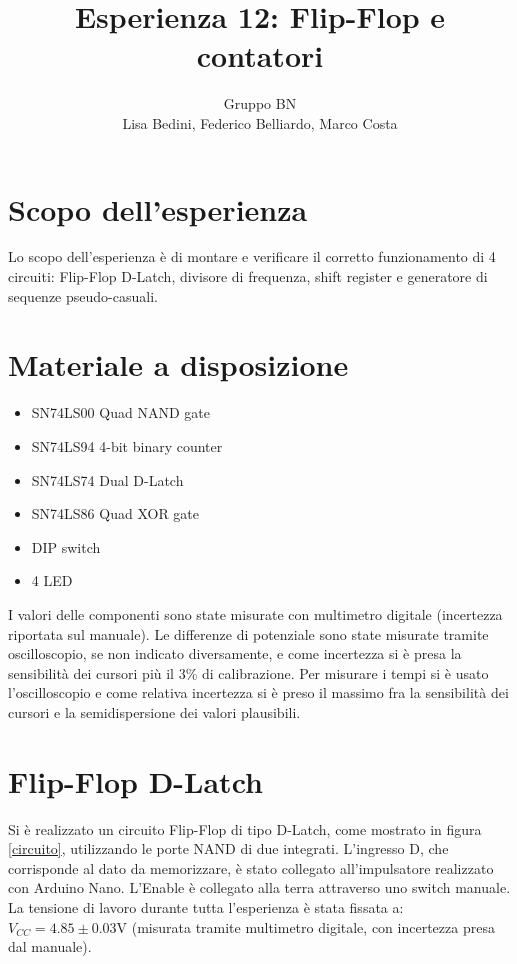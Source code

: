 \documentclass[10pt,a4paper]{article}
\author{Gruppo BN \\Lisa Bedini,  Federico Belliardo, Marco Costa}
\title{Esperienza 12: Flip-Flop e contatori}
\begin{document}
\maketitle


\section{Scopo dell'esperienza}
Lo scopo dell'esperienza è di montare e verificare il corretto funzionamento di 4 circuiti: Flip-Flop D-Latch, divisore di frequenza, shift register e generatore di sequenze pseudo-casuali.

\section{Materiale a disposizione}
\begin{itemize}
\item SN74LS00 Quad NAND gate
\item SN74LS94 4-bit binary counter
\item SN74LS74 Dual D-Latch
\item SN74LS86 Quad XOR gate
\item DIP switch
\item 4 LED
\end{itemize}
I valori delle componenti sono state misurate con multimetro digitale (incertezza riportata sul manuale).
Le differenze di potenziale sono state misurate tramite oscilloscopio, se non indicato diversamente, e come incertezza si è presa la sensibilità dei cursori più il 3\% di calibrazione.
Per misurare i tempi si è usato l'oscilloscopio e come relativa incertezza si è preso il massimo fra la sensibilità dei cursori e la semidispersione dei valori plausibili.

\section{Flip-Flop D-Latch}
Si è realizzato un circuito Flip-Flop di tipo D-Latch, come mostrato in figura \ref{circuito}, utilizzando le porte NAND di due integrati. L'ingresso D, che corrisponde al dato da memorizzare, è stato collegato all'impulsatore realizzato con Arduino Nano. L'Enable è collegato alla terra attraverso uno switch manuale. La tensione di lavoro durante tutta l'esperienza è stata fissata a: $V_{CC} = 4.85 \pm 0.03$V (misurata tramite multimetro digitale, con incertezza presa dal manuale).\\ 
\end{document}
